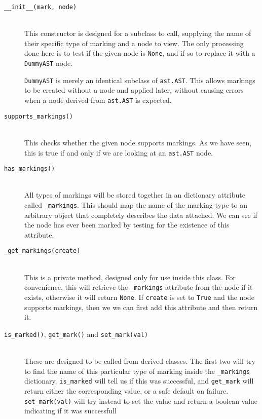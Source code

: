 \documentclass{report}
\begin{document}
\begin{description}
\item[\texttt{\_\_init\_\_(mark, node)}] \hfill \\
This constructor is designed for a subclass to call, supplying the name of their specific type of marking and a node to view. The only
processing done here is to test if the given node is \texttt{None}, and if so to replace it with a \texttt{DummyAST} node.

\texttt{DummyAST} is merely an identical subclass of \texttt{ast.AST}. This allows markings to be created without a node and applied later,
without causing errors when a node derived from \texttt{ast.AST} is expected.

\item[\texttt{supports\_markings()}] \hfill \\
This checks whether the given node supports markings. As we have seen, this is true if and only if we are looking at an \texttt{ast.AST}
node.

\item[\texttt{has\_markings()}] \hfill \\
All types of markings will be stored together in an dictionary attribute called \texttt{\_markings}. This should map the name of the marking
type to an arbitrary object that completely describes the data attached. We can see if the node has ever been marked by testing for the
existence of this attribute.

\item[\texttt{\_get\_markings(create)}] \hfill \\
This is a private method, designed only for use inside this class. For convenience, this will retrieve the \texttt{\_markings} attribute
from the node if it exists, otherwise it will return \texttt{None}. If \texttt{create} is set to \texttt{True} and the node supports
markings, then we we can first add this attribute and then return it.

\item[\texttt{is\_marked()}, \texttt{get\_mark()} and \texttt{set\_mark(val)}] \hfill \\
These are designed to be called from derived classes. The first two will try to find the name of this particular type of marking inside
the \texttt{\_markings} dictionary. \texttt{is\_marked} will tell us if this was successful, and \texttt{get\_mark} will return either the
corresponding value, or a safe default on failure. \texttt{set\_mark(val)} will try instead to set the value and return a boolean value
indicating if it was successfull


\end{description}
\end{document}
